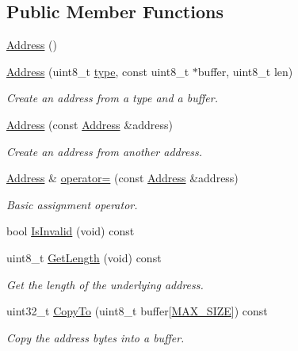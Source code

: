 \subsection*{Public Member Functions}
\begin{DoxyCompactItemize}
\item 
\hyperlink{classns3_1_1Address_a9151562b6562bbbc76f459abe1f9a726}{Address} ()
\item 
\hyperlink{classns3_1_1Address_ae161cacc2e5f335c1f3554b569b5b5a8}{Address} (uint8\+\_\+t \hyperlink{visualizer-ideas_8txt_add98db9e15e2a58cf2b57623e7aa893a}{type}, const uint8\+\_\+t $\ast$buffer, uint8\+\_\+t len)
\begin{DoxyCompactList}\small\item\em Create an address from a type and a buffer. \end{DoxyCompactList}\item 
\hyperlink{classns3_1_1Address_aa8e374f3910cdb0c28b3d49ed0e92d1d}{Address} (const \hyperlink{classns3_1_1Address}{Address} \&address)
\begin{DoxyCompactList}\small\item\em Create an address from another address. \end{DoxyCompactList}\item 
\hyperlink{classns3_1_1Address}{Address} \& \hyperlink{classns3_1_1Address_a88049b65062cc83ca01e39ca9920d2fc}{operator=} (const \hyperlink{classns3_1_1Address}{Address} \&address)
\begin{DoxyCompactList}\small\item\em Basic assignment operator. \end{DoxyCompactList}\item 
bool \hyperlink{classns3_1_1Address_adfefe8eeb274514e4f171f4068f7e882}{Is\+Invalid} (void) const 
\item 
uint8\+\_\+t \hyperlink{classns3_1_1Address_a0b475044755d73618f308cd9438dd8ef}{Get\+Length} (void) const 
\begin{DoxyCompactList}\small\item\em Get the length of the underlying address. \end{DoxyCompactList}\item 
uint32\+\_\+t \hyperlink{classns3_1_1Address_a6d2f5089f145dc5ce1e20abc263d511d}{Copy\+To} (uint8\+\_\+t buffer\mbox{[}\hyperlink{classns3_1_1Address_a34cb50781c65195ba10651d82d084b4fae450cf1a7cb3df8a05d29b23aecf7f84}{M\+A\+X\+\_\+\+S\+I\+ZE}\mbox{]}) const 
\begin{DoxyCompactList}\small\item\em Copy the address bytes into a buffer. \end{DoxyCompactList}\item 

\end{DoxyCompactItemize}
